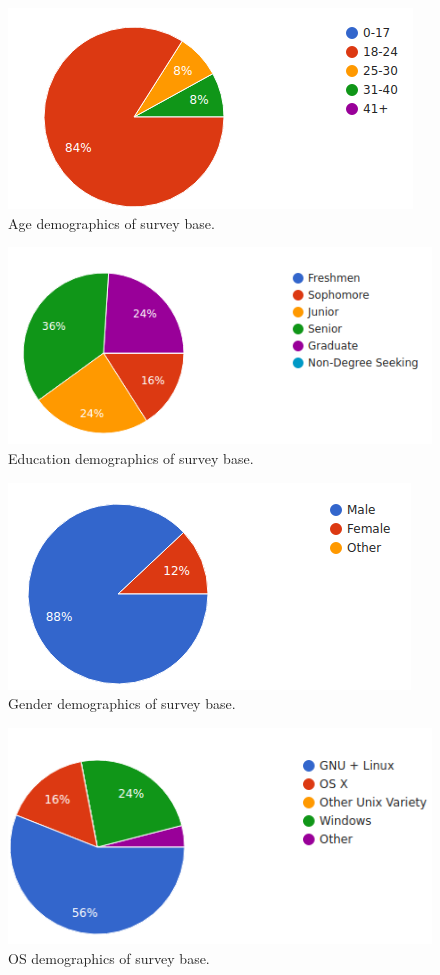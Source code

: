 \begin{figure}[ht]
  \centering
  \includegraphics[width=0.8\linewidth]{figures/stats/age.png}
  \caption{\label{fig:age} Age demographics of survey base. }
\end{figure}

\begin{figure}[ht]
  \centering
  \includegraphics[width=0.8\linewidth]{figures/stats/edu.png}
  \caption{\label{fig:edu} Education demographics of survey base. }
\end{figure}

\begin{figure}[ht]
  \centering
  \includegraphics[width=0.8\linewidth]{figures/stats/gender.png}
  \caption{\label{fig:gender} Gender demographics of survey base. }
\end{figure}

\begin{figure}[ht]
  \centering
  \includegraphics[width=0.8\linewidth]{figures/stats/os.png}
  \caption{\label{fig:OS} OS demographics of survey base. }
\end{figure}

